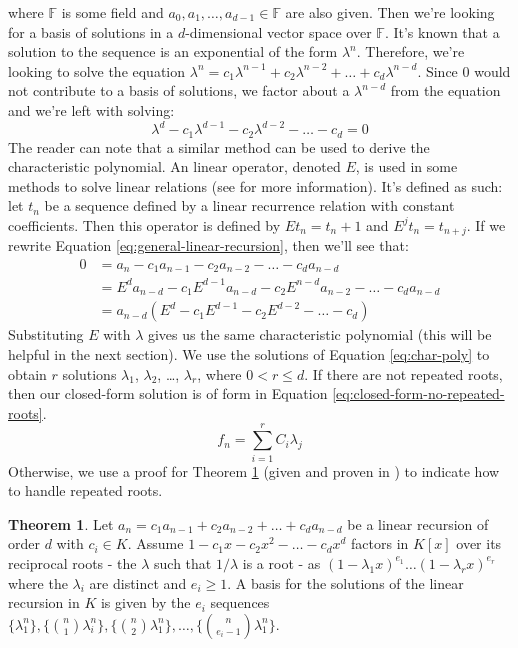 \documentclass[a4paper]{article}
\theoremstyle{definition}
\newtheorem{theorem}{Theorem}[section]
\begin{document}
where $\mathbb{F}$ is some field and $a_0, a_1, \ldots, a_{d-1} \in \mathbb{F}$ are also given. Then we're looking for a basis of solutions in a $d$-dimensional vector space over $\mathbb{F}$. It's known that a solution to the sequence is an exponential of the form $\lambda^n$\cite{bib:solve-lin-rec-field}. Therefore, we're looking to solve the equation $\lambda^n=c_1\lambda^{n-1}+c_2\lambda^{n-2}+\ldots+c_d\lambda^{n-d}$. Since $0$ would not contribute to a basis of solutions, we factor about a $\lambda^{n-d}$ from the equation and we're left with solving:
\begin{equation}
\lambda^d-c_1\lambda^{d-1}-c_2\lambda^{d-2}-\ldots-c_d=0
\label{eq:char-poly}
\end{equation}
The reader can note that a similar method can be used to derive the characteristic polynomial. An linear operator, denoted $E$, is used in some methods to solve linear relations (see \cite{bib:successor-explained} for more information). It's defined as such: let $t_n$ be a sequence defined by a linear recurrence relation with constant coefficients. Then this operator is defined by $Et_n=t_n+1$ and $E^jt_n=t_{n+j}$\cite{bib:gen_cond_rec}. If we rewrite Equation \ref{eq:general-linear-recursion}, then we'll see that:
\begin{align*}
0
&= a_n-c_1a_{n-1}-c_2a_{n-2}-\ldots-c_da_{n-d} \\
&= E^da_{n-d}-c_1E^{d-1}a_{n-d}-c_2E^{n-d}a_{n-2}-\ldots-c_da_{n-d} \\
&= a_{n-d}(E^d-c_1E^{d-1}-c_2E^{d-2}-\ldots-c_d)
\end{align*}
Substituting $E$ with $\lambda$ gives us the same characteristic polynomial (this will be helpful in the next section). We use the solutions of Equation \ref{eq:char-poly} to obtain $r$ solutions $\lambda_1$, $\lambda_2$, \ldots, $\lambda_r$, where $0<r\le d$. If there are not repeated roots, then our closed-form solution is of form in Equation \ref{eq:closed-form-no-repeated-roots}.
\begin{equation}
f_n=\sum_{i=1}^r C_{i}\lambda_j
\label{eq:closed-form-no-repeated-roots}
\end{equation}
Otherwise, we use a proof for Theorem \ref{thm:repeated-roots} (given and proven in \cite{bib:solve-lin-rec-field}) to indicate how to handle repeated roots. 
\\
\begin{theorem}
Let $a_n = c_1a_{n-1} + c_2a_{n-2} + \ldots + c_da_{n-d}$ be a linear recursion of order $d$ with $c_i \in K$. Assume $1 - c_1x - c_2x^2 - \ldots - c_dx^d$ factors in $K[x]$ over its reciprocal roots - the $\lambda$ such that $1/\lambda$ is a root - as $(1-\lambda_1x)^{e_1} \ldots (1-\lambda_rx)^{e_r}$ where the $\lambda_i$ are distinct and $e_i \ge 1$. A basis for the solutions of the linear recursion in $K$ is given by the $e_i$ sequences $\{\lambda_1^n\}, \{\binom{n}{1}\lambda_i^n\}, \{\binom{n}{2}\lambda_1^n\}, \ldots, \{\binom{n}{e_i-1}\lambda_1^n\}$.
\label{thm:repeated-roots}
\end{theorem}
\end{document}
